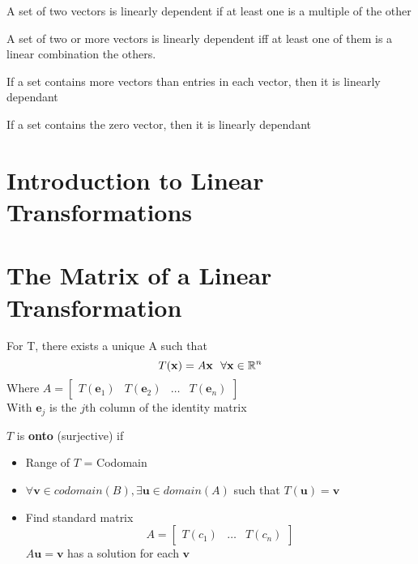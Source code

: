 \documentclass{report}
\begin{document}
A set of two vectors is linearly dependent if at least one is a multiple of the other

\begin{theorem}
\end{theorem}
A set of two or more vectors is linearly dependent iff at least one of them is a linear combination the others.

\begin{theorem}
\end{theorem}
If a set contains more vectors than entries in each vector, then it is linearly dependant 

\begin{theorem}
\end{theorem}
If a set contains the zero vector, then it is linearly dependant 

\section{Introduction to Linear Transformations}

\section{The Matrix of a Linear Transformation}

\begin{theorem}
\end{theorem}
For T, there exists a unique A such that
\[
T(\mathbf{x}) = A \mathbf{x}\ \ \forall \mathbf{x} \in \mathbb{R}^n\\
\]
Where $A = \begin{bmatrix} T(\mathbf{e}_1) & T(\mathbf{e}_2) & \dots & T(\mathbf{e}_n) \end{bmatrix}$\\
With $\mathbf{e}_j$ is the $j$th column of the identity matrix


\begin{definition}
\end{definition}
$T$ is \textbf{onto} (surjective) if
\begin{itemize}
    \item Range of $T$ = Codomain
    \item $\forall \mathbf{v} \in codomain (B), \exists
    \mathbf{u} \in domain (A)$ such that $T(\mathbf{u})=\mathbf{v}$
    \item Find standard matrix 
    \[
    A = \begin{bmatrix}
        T(c_1) & \ldots & T(c_n)
    \end{bmatrix}
    \]
    $A \mathbf{u} = \mathbf{v}$ has a solution for each $\mathbf{v}$
\end{itemize}
\end{document}

